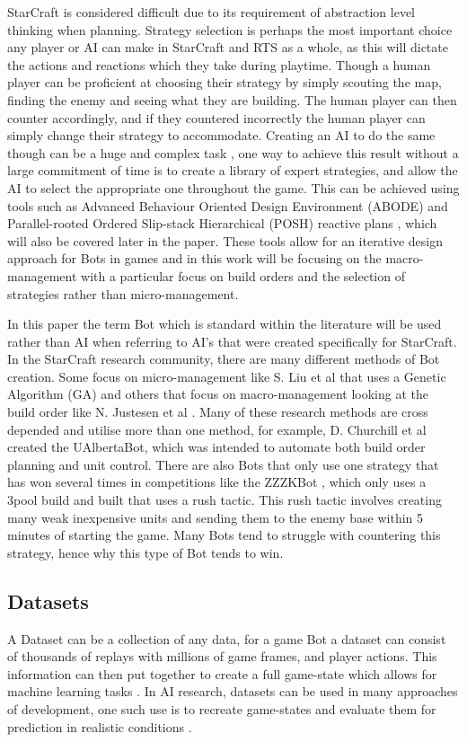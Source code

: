 \documentclass[journal]{IEEEtran}
\begin{document}
StarCraft is considered difficult due to its requirement of abstraction level thinking when planning. Strategy selection is perhaps the most important choice any player or AI can make in StarCraft and RTS as a whole, as this will dictate the actions and reactions which they take during playtime. Though a human player can be proficient at choosing their strategy by simply scouting the map, finding the enemy and seeing what they are building. The human player can then counter accordingly, and if they countered incorrectly the human player can simply change their strategy to accommodate. Creating an AI to do the same though can be a huge and complex task \cite{Fuzzy,OnlineEvo,GoalDriven}, one way to achieve this result without a large commitment of time is to create a library of expert strategies, and allow the AI to select the appropriate one throughout the game. This can be achieved using tools such as Advanced Behaviour Oriented Design Environment (ABODE) and Parallel-rooted Ordered Slip-stack Hierarchical (POSH) reactive plans \cite{POSH}, which will also be covered later in the paper. These tools allow for an iterative design approach for Bots in games and in this work will be focusing on the macro-management with a particular focus on build orders and the selection of strategies rather than micro-management. 

In this paper the term Bot which is standard within the literature will be used rather than AI when referring to AI's that were created specifically for StarCraft. In the StarCraft research community, there are many different methods of Bot creation. Some focus on micro-management like S. Liu et al \cite{EffectiveMicro} that uses a Genetic Algorithm (GA) and others that focus on macro-management looking at the build order like N. Justesen et al \cite{OnlineEvo}. Many of these research methods are cross depended and utilise more than one method, for example, D. Churchill et al \cite{Agents} created the UAlbertaBot, which was intended to automate both build order planning and unit control. There are also Bots that only use one strategy that has won several times in competitions like the ZZZKBot \cite{ZZZK,Results}, which only uses a 3pool build and built that uses a rush tactic. This rush tactic involves creating many weak inexpensive units and sending them to the enemy base within 5 minutes of starting the game. Many Bots tend to struggle with countering this strategy, hence why this type of Bot tends to win.

\subsection{Datasets}
A Dataset can be a collection of any data, for a game Bot a dataset can consist of thousands of replays with millions of game frames, and player actions\cite{Dataset}. This information can then put together to create a full game-state which allows for machine learning tasks \cite{Dataset17}. In AI research, datasets can be used in many approaches of development, one such use is to recreate game-states and evaluate them for prediction in realistic conditions \cite{SpecialTactics}.
\end{document}
